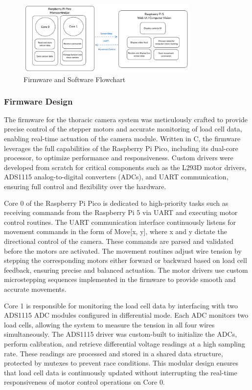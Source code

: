 \begin{figure}[H]
    \centering
    \includegraphics[width=0.8\textwidth]{images/software_flowchart.png}
    \caption{Firmware and Software Flowchart}
    \label{fig:software_flowchart}
\end{figure}


\subsubsection{Firmware Design}
The firmware for the thoracic camera system was meticulously crafted to provide precise control of the stepper motors and accurate monitoring of load cell data, enabling real-time actuation of the camera module. Written in C, the firmware leverages the full capabilities of the Raspberry Pi Pico, including its dual-core processor, to optimize performance and responsiveness. Custom drivers were developed from scratch for critical components such as the L293D motor drivers, ADS1115 analog-to-digital converters (ADCs), and UART communication, ensuring full control and flexibility over the hardware.

Core 0 of the Raspberry Pi Pico is dedicated to high-priority tasks such as receiving commands from the Raspberry Pi 5 via UART and executing motor control routines. The UART communication interface continuously listens for movement commands in the form of Move[x, y], where x and y dictate the directional control of the camera. These commands are parsed and validated before the motors are activated. The movement routines adjust wire tension by stepping the corresponding motors either forward or backward based on load cell feedback, ensuring precise and balanced actuation. The motor drivers use custom microstepping sequences implemented in the firmware to provide smooth and accurate movements.

Core 1 is responsible for monitoring the load cell data by interfacing with two ADS1115 ADC modules configured in differential mode. Each ADC monitors two load cells, allowing the system to measure the tension in all four wires simultaneously. The ADS1115 driver was custom-built to initialize the ADCs, perform calibration, and retrieve differential voltage readings at a high sampling rate. These readings are processed and stored in a shared data structure, protected by mutexes to prevent race conditions. This modular design ensures that load cell data is continuously updated without interrupting the real-time responsiveness of motor control operations on Core 0.

